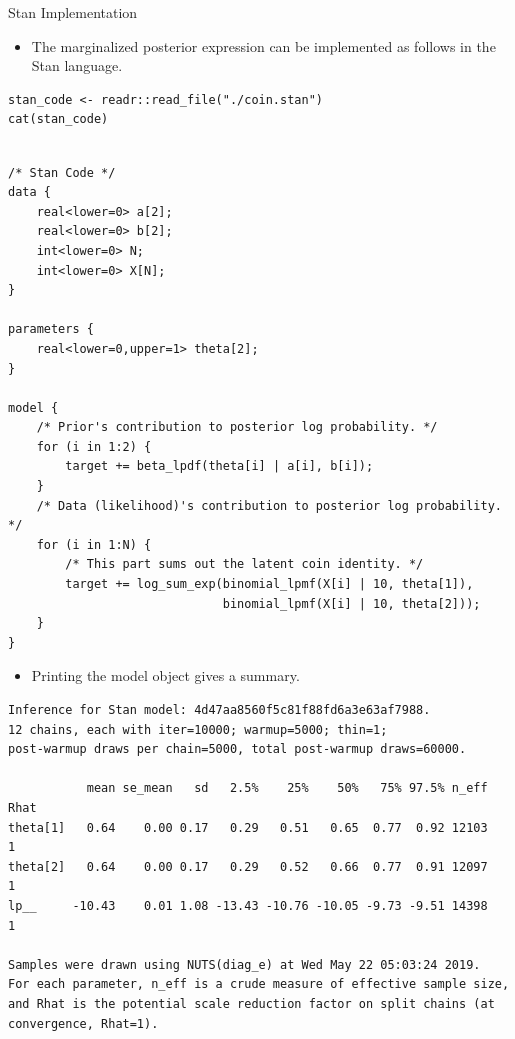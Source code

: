 \documentclass[dvipdfmx,bigger,aspectratio=169]{beamer}
\begin{document}
\begin{frame}[fragile,allowframebreaks,label=,t]{Stan Implementation}
 \begin{itemize}
\item The marginalized posterior expression can be implemented as follows in the Stan language.
\end{itemize}
\scriptsize
\begin{verbatim}
stan_code <- readr::read_file("./coin.stan")
cat(stan_code)
\end{verbatim}

\begin{verbatim}

/* Stan Code */
data {
    real<lower=0> a[2];
    real<lower=0> b[2];
    int<lower=0> N;
    int<lower=0> X[N];
}

parameters {
    real<lower=0,upper=1> theta[2];
}

model {
    /* Prior's contribution to posterior log probability. */
    for (i in 1:2) {
        target += beta_lpdf(theta[i] | a[i], b[i]);
    }
    /* Data (likelihood)'s contribution to posterior log probability. */
    for (i in 1:N) {
        /* This part sums out the latent coin identity. */
        target += log_sum_exp(binomial_lpmf(X[i] | 10, theta[1]),
                              binomial_lpmf(X[i] | 10, theta[2]));
    }
}
\end{verbatim}

\normalsize
\scriptsize
\normalsize
\newpage
\begin{itemize}
\item Printing the model object gives a summary.
\end{itemize}
\scriptsize
\begin{verbatim}
Inference for Stan model: 4d47aa8560f5c81f88fd6a3e63af7988.
12 chains, each with iter=10000; warmup=5000; thin=1; 
post-warmup draws per chain=5000, total post-warmup draws=60000.

           mean se_mean   sd   2.5%    25%    50%   75% 97.5% n_eff Rhat
theta[1]   0.64    0.00 0.17   0.29   0.51   0.65  0.77  0.92 12103    1
theta[2]   0.64    0.00 0.17   0.29   0.52   0.66  0.77  0.91 12097    1
lp__     -10.43    0.01 1.08 -13.43 -10.76 -10.05 -9.73 -9.51 14398    1

Samples were drawn using NUTS(diag_e) at Wed May 22 05:03:24 2019.
For each parameter, n_eff is a crude measure of effective sample size,
and Rhat is the potential scale reduction factor on split chains (at 
convergence, Rhat=1).
\end{verbatim}

\normalsize
\end{frame}
\end{document}
